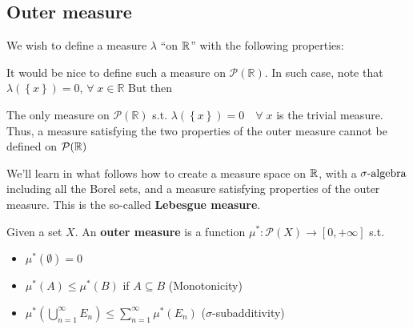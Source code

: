 \subsection{Outer measure}
We wish to define a measure \(\lambda\) ``on \(\mathbb{R}\)'' with the following properties:
It would be nice to define such a measure on \(\mathcal{P}(\mathbb{R})\). In such case, note that \(\lambda(\left\lbrace x \right\rbrace) = 0\), \(\forall \; x \in \mathbb{R}\)
But then 
\begin{theorem}[Ulam]
    The only measure on \(\mathcal{P}(\mathbb{R})\) s.t. \(\lambda(\left\lbrace x \right\rbrace) = 0 \quad \forall \; x\) is the trivial measure. Thus, a measure satisfying the two properties of the outer measure cannot be defined on \(\mathcal{P}(\mathbb{R})\)
\end{theorem}

We'll learn in what follows how to create a measure space on \(\mathbb{R}\), with a \(\sigma\mbox{-algebra}\) including all the Borel sets, and a measure satisfying properties of the outer measure. This is the so-called \textbf{Lebesgue measure}.
\begin{definition}
    Given a set \(X\). An \textbf{outer measure} is a function \(\mu^* : \mathcal{P}(X) \to [0, +\infty]\) s.t. 
    \begin{itemize}
        \item \(\mu^*(\emptyset) = 0\)
        \item \(\mu^*(A) \leq \mu^*(B)\) if \(A \subseteq B\) (Monotonicity)
        \item \(\mu^*(\bigcup_{n=1}^{\infty} E_n) \leq \sum_{n=1}^{\infty} \mu^*(E_n)\) (\(\sigma\)-subadditivity)
    \end{itemize}
\end{definition}
